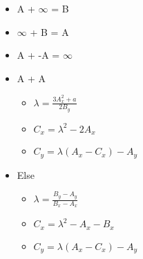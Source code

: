 \begin{itemize}
    \item[] A + $\infty$ = B
    \item[] $\infty$ + B = A
    \item[] A + -A = $\infty$
    \item[] A + A
    \begin{itemize}
        \item[] $\lambda = \frac{3A_x^2 + a} {2B_y}$
        \item[] $C_x = \lambda^2 - 2A_x$
        \item[] $C_y = \lambda(A_x - C_x) - A_y$
    \end{itemize}
    \item[] Else
    \begin{itemize}
        \item[] $\lambda = \frac{B_y - A_y} {B_x - A_x}$
        \item[] $C_x = \lambda^2 - A_x - B_x$
        \item[] $C_y = \lambda(A_x - C_x) - A_y$
    \end{itemize}
\end{itemize}

